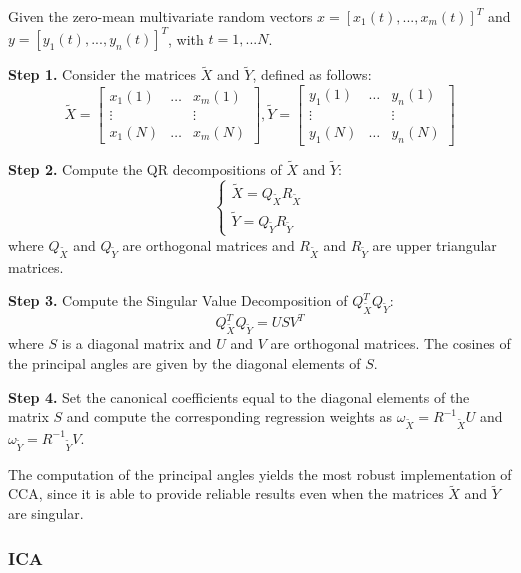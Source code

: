 Given the zero-mean multivariate random vectors $x=[x_1(t), ... , x_m(t)]^T$ and $y=[y_1(t), ... , y_n(t)]^T$, with $t=1, ...  N$.

\textbf{Step 1.} Consider the matrices $\tilde{X}$ and $\tilde{Y}$, defined as follows:
\begin{equation}
\tilde{X}=\begin{bmatrix} 
x_1(1) & \dots & x_m(1) \\
\vdots &  &\vdots\\
x_1(N) & \dots & x_m(N) 
\end{bmatrix},
\tilde{Y}=\begin{bmatrix} 
y_1(1) & \dots & y_n(1) \\
\vdots &  &\vdots\\
y_1(N) & \dots & y_n(N) 
\end{bmatrix}
\end{equation}

\textbf{Step 2.} Compute the QR decompositions of $\tilde{X}$ and $\tilde{Y}$:
\begin{equation}\begin{cases} \tilde{X}=Q_{\tilde{X}}R_{\tilde{X}} \\ \tilde{Y}=Q_{\tilde{Y}}R_{\tilde{Y}}  \end{cases}
\end{equation}
where $Q_{\tilde{X}}$ and  $Q_{\tilde{Y}}$ are orthogonal matrices and $R_{\tilde{X}}$ and  $R_{\tilde{Y}}$ are upper triangular matrices.

\textbf{Step 3.} Compute the Singular Value Decomposition of $Q^T_{\tilde{X}}Q_{\tilde{Y}}$:
\begin{equation}
Q^T_{\tilde{X}}Q_{\tilde{Y}}=US{V^T}
\end{equation}
where $S$ is a diagonal matrix and $U$ and $V$ are orthogonal matrices. The cosines of the principal angles are given by the diagonal elements of $S$.

\textbf{Step 4.} Set the canonical coefficients equal to the diagonal elements of the matrix $S$ and compute the corresponding regression weights as $\omega_{\tilde{X}}={R^{-1}}_{\tilde{X}}U$ and $\omega_{\tilde{Y}}={R^{-1}}_{\tilde{Y}}V$.

The computation of the principal angles yields the most robust implementation of CCA, since it is able to provide reliable results even when the matrices $\tilde{X}$ and $\tilde{Y}$ are singular. 


\subsubsection{ICA}\label{ap3}


